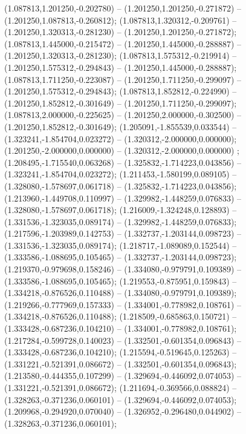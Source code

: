  (1.087813,1.201250,-0.202780) -- (1.201250,1.201250,-0.271872) -- (1.201250,1.087813,-0.260812);
 (1.087813,1.320312,-0.209761) -- (1.201250,1.320313,-0.281230) -- (1.201250,1.201250,-0.271872);
 (1.087813,1.445000,-0.215472) -- (1.201250,1.445000,-0.288887) -- (1.201250,1.320313,-0.281230);
 (1.087813,1.575312,-0.219914) -- (1.201250,1.575312,-0.294843) -- (1.201250,1.445000,-0.288887);
 (1.087813,1.711250,-0.223087) -- (1.201250,1.711250,-0.299097) -- (1.201250,1.575312,-0.294843);
 (1.087813,1.852812,-0.224990) -- (1.201250,1.852812,-0.301649) -- (1.201250,1.711250,-0.299097);
 (1.087813,2.000000,-0.225625) -- (1.201250,2.000000,-0.302500) -- (1.201250,1.852812,-0.301649);
 (1.205091,-1.855539,0.033544) -- (1.323241,-1.854704,0.023272) -- (1.320312,-2.000000,0.000000);
 (1.201250,-2.000000,0.000000) -- (1.320312,-2.000000,0.000000) ;
 (1.208495,-1.715540,0.063268) -- (1.325832,-1.714223,0.043856) -- (1.323241,-1.854704,0.023272);
 (1.211453,-1.580199,0.089105) -- (1.328080,-1.578697,0.061718) -- (1.325832,-1.714223,0.043856);
 (1.213960,-1.449708,0.110997) -- (1.329982,-1.448259,0.076833) -- (1.328080,-1.578697,0.061718);
 (1.216009,-1.324248,0.128893) -- (1.331536,-1.323035,0.089174) -- (1.329982,-1.448259,0.076833);
 (1.217596,-1.203989,0.142753) -- (1.332737,-1.203144,0.098723) -- (1.331536,-1.323035,0.089174);
 (1.218717,-1.089089,0.152544) -- (1.333586,-1.088695,0.105465) -- (1.332737,-1.203144,0.098723);
 (1.219370,-0.979698,0.158246) -- (1.334080,-0.979791,0.109389) -- (1.333586,-1.088695,0.105465);
 (1.219553,-0.875951,0.159843) -- (1.334218,-0.876526,0.110488) -- (1.334080,-0.979791,0.109389);
 (1.219266,-0.777969,0.157333) -- (1.334001,-0.778982,0.108761) -- (1.334218,-0.876526,0.110488);
 (1.218509,-0.685863,0.150721) -- (1.333428,-0.687236,0.104210) -- (1.334001,-0.778982,0.108761);
 (1.217284,-0.599728,0.140023) -- (1.332501,-0.601354,0.096843) -- (1.333428,-0.687236,0.104210);
 (1.215594,-0.519645,0.125263) -- (1.331221,-0.521391,0.086672) -- (1.332501,-0.601354,0.096843);
 (1.213580,-0.444355,0.107299) -- (1.329694,-0.446092,0.074053) -- (1.331221,-0.521391,0.086672);
 (1.211694,-0.369566,0.088824) -- (1.328263,-0.371236,0.060101) -- (1.329694,-0.446092,0.074053);
 (1.209968,-0.294920,0.070040) -- (1.326952,-0.296480,0.044902) -- (1.328263,-0.371236,0.060101);
